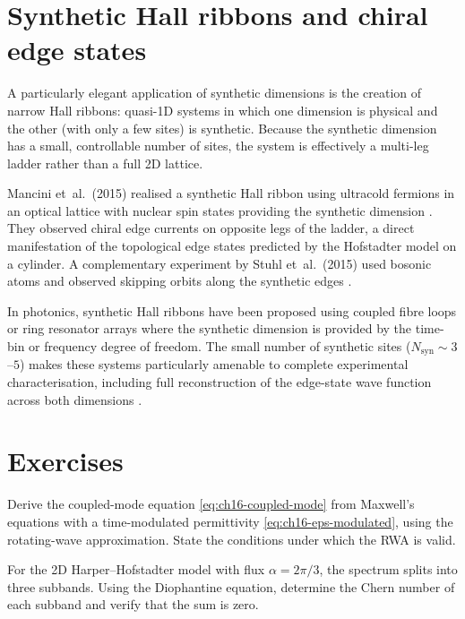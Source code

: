 \section{Synthetic Hall ribbons and chiral edge states}
\label{sec:ch16-hall-ribbons}

A particularly elegant application of synthetic dimensions is the
creation of narrow Hall ribbons: quasi-1D systems in which one
dimension is physical and the other (with only a few sites) is
synthetic.  Because the synthetic dimension has a small, controllable
number of sites, the system is effectively a multi-leg ladder rather
than a full 2D lattice.

Mancini et~al.\ (2015) realised a synthetic Hall ribbon using
ultracold fermions in an optical lattice with nuclear spin states
providing the synthetic dimension \cite{mancini2015observation}.
They observed chiral edge currents on opposite legs of the ladder,
a direct manifestation of the topological edge states predicted by
the Hofstadter model on a cylinder.  A complementary experiment by
Stuhl et~al.\ (2015) used bosonic atoms and observed skipping orbits
along the synthetic edges \cite{stuhl2015visualizing}.

In photonics, synthetic Hall ribbons have been proposed using coupled
fibre loops or ring resonator arrays where the synthetic dimension
is provided by the time-bin or frequency degree of freedom.  The
small number of synthetic sites ($N_{\mathrm{syn}}\sim 3$--$5$)
makes these systems particularly amenable to complete experimental
characterisation, including full reconstruction of the edge-state
wave function across both dimensions
\cite{ozawa2018topological,guglielmon2017photonic}.

\section*{Exercises}

\begin{exercise}
  Derive the coupled-mode equation \eqref{eq:ch16-coupled-mode} from
  Maxwell's equations with a time-modulated permittivity
  \eqref{eq:ch16-eps-modulated}, using the rotating-wave approximation.
  State the conditions under which the RWA is valid.
\end{exercise}

\begin{exercise}
  For the 2D Harper--Hofstadter model with flux $\alpha=2\pi/3$, the
  spectrum splits into three subbands.  Using the Diophantine equation,
  determine the Chern number of each subband and verify that the sum
  is zero.
\end{exercise}


